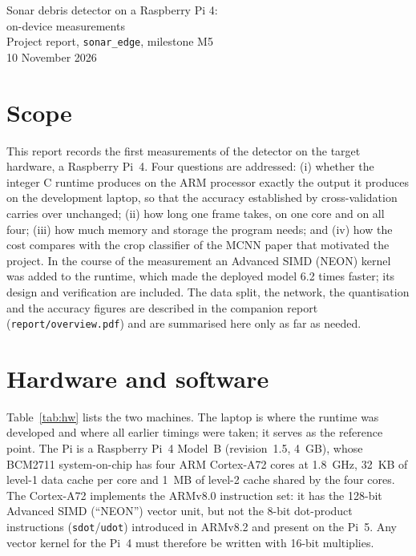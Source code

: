 \documentclass[11pt,a4paper]{article}
\begin{document}
\begin{center}
  {\LARGE Sonar debris detector on a Raspberry Pi 4:\\[0.2em] on-device measurements}\\[0.6em]
  {\large Project report, \texttt{sonar\_edge}, milestone M5}\\[0.3em]
  10 November 2026
\end{center}
\vspace{0.5em}

\section*{Scope}

This report records the first measurements of the detector on the target
hardware, a Raspberry Pi~4. Four questions are addressed: (i) whether the
integer C runtime produces on the ARM processor exactly the output it
produces on the development laptop, so that the accuracy established by
cross-validation carries over unchanged; (ii) how long one frame takes, on
one core and on all four; (iii) how much memory and storage the program
needs; and (iv) how the cost compares with the crop classifier of the MCNN
paper that motivated the project. In the course of the measurement an
Advanced SIMD (NEON) kernel was added to the runtime, which made the
deployed model 6.2 times faster; its design and verification are included.
The data split, the network, the quantisation and the accuracy figures are
described in the companion report (\texttt{report/overview.pdf}) and are
summarised here only as far as needed.

\tableofcontents

\section{Hardware and software}
\label{sec:setup}

Table~\ref{tab:hw} lists the two machines. The laptop is where the runtime
was developed and where all earlier timings were taken; it serves as the
reference point. The Pi is a Raspberry Pi~4 Model~B (revision~1.5, 4~GB),
whose BCM2711 system-on-chip has four ARM Cortex-A72 cores at
\SI{1.8}{GHz}, \SI{32}{KB} of level-1 data cache per core and \SI{1}{MB} of
level-2 cache shared by the four cores. The Cortex-A72 implements the ARMv8.0
instruction set: it has the 128-bit Advanced SIMD (``NEON'') vector unit,
but not the 8-bit dot-product instructions (\texttt{sdot}/\texttt{udot})
introduced in ARMv8.2 and present on the Pi~5. Any vector kernel for the
Pi~4 must therefore be written with 16-bit multiplies.
\end{document}
